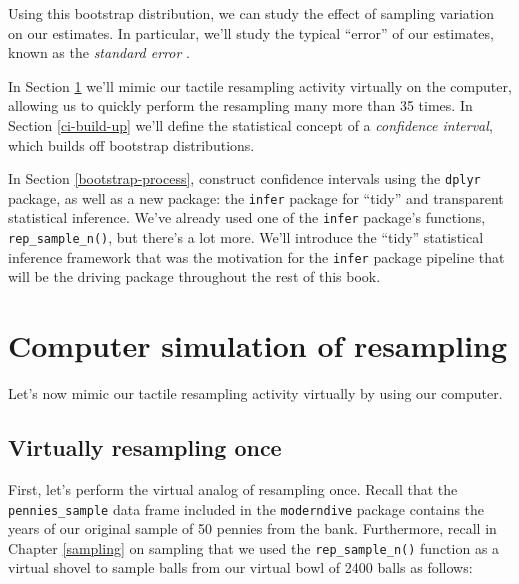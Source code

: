 \documentclass[
]{book}
\newenvironment{Shaded}{\begin{snugshade}}{\end{snugshade}}
\newcommand{\DataTypeTok}[1]{\textcolor[rgb]{0.13,0.29,0.53}{#1}}
\newcommand{\DecValTok}[1]{\textcolor[rgb]{0.00,0.00,0.81}{#1}}
\newcommand{\KeywordTok}[1]{\textcolor[rgb]{0.13,0.29,0.53}{\textbf{#1}}}
\newcommand{\NormalTok}[1]{#1}
\newcommand{\OperatorTok}[1]{\textcolor[rgb]{0.81,0.36,0.00}{\textbf{#1}}}
\newcommand{\StringTok}[1]{\textcolor[rgb]{0.31,0.60,0.02}{#1}}
\begin{document}
Using this bootstrap distribution, we can study the effect of sampling variation on our estimates. In particular, we'll study the typical ``error'' of our estimates, known as the \emph{standard error} .

In Section \ref{resampling-simulation} we'll mimic our tactile resampling activity virtually on the computer, allowing us to quickly perform the resampling many more than 35 times. In Section \ref{ci-build-up} we'll define the statistical concept of a \emph{confidence interval}, which builds off bootstrap distributions.

In Section \ref{bootstrap-process}, construct confidence intervals using the \texttt{dplyr} package, as well as a new package: the \texttt{infer} package for ``tidy'' and transparent statistical inference. We've already used one of the \texttt{infer} package's functions, \texttt{rep\_sample\_n()}, but there's a lot more. We'll introduce the ``tidy'' statistical inference framework that was the motivation for the \texttt{infer} package pipeline that will be the driving package throughout the rest of this book.

\hypertarget{resampling-simulation}{%
\section{Computer simulation of resampling}\label{resampling-simulation}}

Let's now mimic our tactile resampling activity virtually by using our computer.

\hypertarget{virtually-resampling-once}{%
\subsection{Virtually resampling once}\label{virtually-resampling-once}}

First, let's perform the virtual analog of resampling once. Recall that the \texttt{pennies\_sample} data frame included in the \texttt{moderndive} package contains the years of our original sample of 50 pennies from the bank. Furthermore, recall in Chapter \ref{sampling} on sampling that we used the \texttt{rep\_sample\_n()} function as a virtual shovel to sample balls from our virtual bowl of 2400 balls as follows:

\begin{Shaded}
\end{Shaded}
\end{document}
